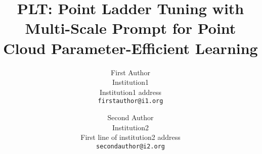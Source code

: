 \documentclass[10pt,twocolumn,letterpaper]{article}
\title{PLT: Point Ladder Tuning with Multi-Scale Prompt for Point Cloud Parameter-Efficient Learning}
\author{First Author\\
	Institution1\\
	Institution1 address\\
	{\tt\small firstauthor@i1.org}
\and
Second Author\\
Institution2\\
First line of institution2 address\\
{\tt\small secondauthor@i2.org}
}
\begin{document}
%  
%
%
%
%
%

{
	\small
	
	
}

\end{document}
